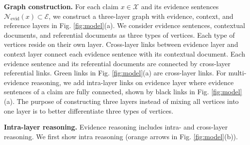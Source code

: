\textbf{Graph construction.} For each claim $ x\in\mathcal{X}$ and its evidence sentences $ \mathcal{N}_{\text{evid}}(x)\subset\mathcal{E} $, we construct a three-layer graph with evidence, context, and reference layers in Fig. \ref{fig:model}(a). We consider evidence sentences, contextual documents, and referential documents as three types of vertices. Each type of vertices reside on their own layer. Cross-layer links between evidence layer and context layer connect each evidence sentence with its contextual document. Each evidence sentence and its referential documents are connected by cross-layer referential links. Green links in Fig. \ref{fig:model}(a) are cross-layer links. For multi-evidence reasoning, we add intra-layer links on evidence layer where evidence sentences of a claim are fully connected, shown by black links in Fig. \ref{fig:model}(a). The purpose of constructing three layers instead of mixing all vertices into one layer is to better differentiate three types of vertices.

\textbf{Intra-layer reasoning.} Evidence reasoning includes intra- and cross-layer reasoning. We first show intra reasoning (orange arrows in Fig. \ref{fig:model}(b)).

